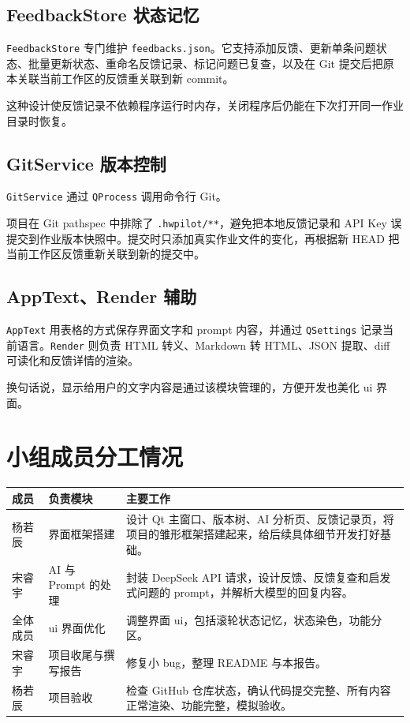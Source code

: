 \documentclass[UTF8,a4paper,11pt,fontset=fandol]{ctexart}
\begin{document}
\subsection{FeedbackStore 状态记忆}

\texttt{FeedbackStore} 专门维护 \texttt{feedbacks.json}。它支持添加反馈、更新单条问题状态、批量更新状态、重命名反馈记录、标记问题已复查，以及在 Git 提交后把原本关联当前工作区的反馈重关联到新 commit。

这种设计使反馈记录不依赖程序运行时内存，关闭程序后仍能在下次打开同一作业目录时恢复。

\subsection{GitService 版本控制}

\texttt{GitService} 通过 \texttt{QProcess} 调用命令行 Git。

项目在 Git pathspec 中排除了 \texttt{.hwpilot/**}，避免把本地反馈记录和 API Key 误提交到作业版本快照中。提交时只添加真实作业文件的变化，再根据新 HEAD 把当前工作区反馈重新关联到新的提交中。

\subsection{AppText、Render 辅助}

\texttt{AppText} 用表格的方式保存界面文字和 prompt 内容，并通过 \texttt{QSettings} 记录当前语言。\texttt{Render} 则负责 HTML 转义、Markdown 转 HTML、JSON 提取、diff 可读化和反馈详情的渲染。

换句话说，显示给用户的文字内容是通过该模块管理的，方便开发也美化 ui 界面。

\section{小组成员分工情况}
\begin{center}
\begin{tabular}{p{3cm}p{4cm}p{6.2cm}}
\toprule
成员 & 负责模块 & 主要工作 \\
\midrule
杨若辰 & 界面框架搭建 & 设计 Qt 主窗口、版本树、AI 分析页、反馈记录页，将项目的雏形框架搭建起来，给后续具体细节开发打好基础。 \\
宋睿宇 & AI 与 Prompt 的处理 & 封装 DeepSeek API 请求，设计反馈、反馈复查和启发式问题的 prompt，并解析大模型的回复内容。 \\
全体成员 & ui 界面优化 & 调整界面 ui，包括滚轮状态记忆，状态染色，功能分区。 \\
宋睿宇 & 项目收尾与撰写报告 & 修复小 bug，整理 README 与本报告。 \\
杨若辰 & 项目验收 & 检查 GitHub 仓库状态，确认代码提交完整、所有内容正常渲染、功能完整，模拟验收。\\
\bottomrule
\end{tabular}
\end{center}
\end{document}

